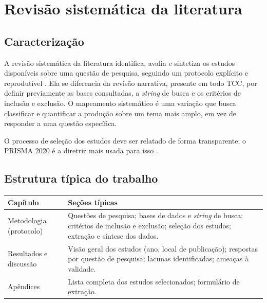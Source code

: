 \section{Revisão sistemática da literatura}
\label{sec_tipo_revisao}

\subsection{Caracterização}

A revisão sistemática da literatura identifica, avalia e sintetiza os estudos disponíveis sobre uma questão de pesquisa, seguindo um protocolo explícito e reprodutível \cite{kitchenham2007guidelines}. Ela se diferencia da revisão narrativa, presente em todo TCC, por definir previamente as bases consultadas, a \textit{string} de busca e os critérios de inclusão e exclusão. O mapeamento sistemático é uma variação que busca classificar e quantificar a produção sobre um tema mais amplo, em vez de responder a uma questão específica.

O processo de seleção dos estudos deve ser relatado de forma transparente; o PRISMA 2020 é a diretriz mais usada para isso \cite{page2021prisma}.

\subsection{Estrutura típica do trabalho}

\begin{quadro}[htb]
	\centering
	\caption{Estrutura típica de um TCC de revisão sistemática.}
	\label{qua_estrutura_revisao}
	\small
	\begin{tabularx}{\textwidth}{|l|X|}
		\hline
		\textbf{Capítulo} & \textbf{Seções típicas} \\ \hline
		Metodologia (protocolo) & Questões de pesquisa; bases de dados e \textit{string} de busca; critérios de inclusão e exclusão; seleção dos estudos; extração e síntese dos dados. \\ \hline
		Resultados e discussão & Visão geral dos estudos (ano, local de publicação); respostas por questão de pesquisa; lacunas identificadas; ameaças à validade. \\ \hline
		Apêndices & Lista completa dos estudos selecionados; formulário de extração. \\ \hline
	\end{tabularx}
\end{quadro}

